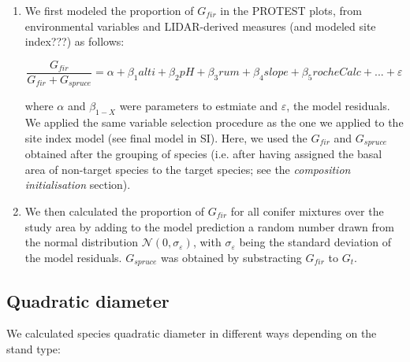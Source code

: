 \documentclass[a4paper]{article}
\begin{document}
\begin{enumerate}

  \item We first modeled the proportion of $G_{fir}$ in the PROTEST plots, from environmental variables and LIDAR-derived measures (and modeled site index???) as follows:

  \begin{equation}\label{gfir-spruce}
  \frac{G_{fir}}{G_{fir} + G_{spruce}} = \alpha + \beta_1 alti + \beta_2 pH +\beta_3 rum +\beta_4 slope +\beta_5 rocheCalc+...+ \varepsilon \end{equation}

  \noindent where $\alpha$ and $\beta_{1-X}$ were parameters to estmiate and $\varepsilon$, the model residuals. We applied the same variable selection procedure as the one we applied to the site index model (see final model in SI). Here, we used the $G_{fir}$ and $G_{spruce}$ obtained after the grouping of species (i.e. after having assigned the basal area of non-target species to the target species; see the \textit{composition initialisation} section).

  \item We then calculated the proportion of $G_{fir}$ for all conifer mixtures over the study area by adding to the model prediction a random number drawn from the normal distribution $\mathcal{N} (0, \sigma_\varepsilon)$, with $\sigma_\varepsilon$ being the standard deviation of the model residuals. $G_{spruce}$ was obtained by substracting $G_{fir}$ to $G_t$.

\end{enumerate}


\subsection*{Quadratic diameter}

We calculated species quadratic diameter in different ways depending on the stand type:
\end{document}
